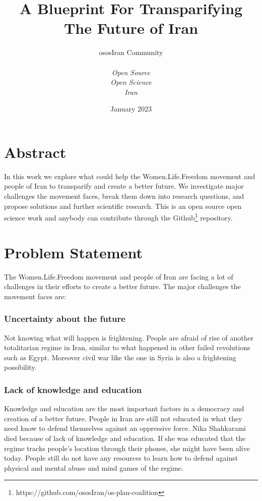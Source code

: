 \documentclass{IEEEtran}
\title{ \Huge \textbf{A Blueprint For Transparifying The Future of Iran} \\[0.5cm]}
\author{
\begin{tabular}{ll}
ososIran Community
\end{tabular} \bigskip \\

\textit{Open Source} \\
\textit{Open Science}\\
\textit{Iran}\\

}
\date{January 2023}
\newcommand{\note}[1]{\todo[inline]{#1}}
\begin{document}
\maketitle




\section{Abstract}

In this work we explore what could help the Women.Life.Freedom movement and people of Iran to transparify and create a better future.
 We investigate major challenges the movement faces, break them down into research questions, and propose solutions and further scientific research.
This is an open source open science work and anybody can contribute through the Github\footnote{https://github.com/ososIran/os-plan-coalition} repository.


\section{Problem Statement}
The Women.Life.Freedom movement and people of Iran are facing a lot of challenges in their efforts to create a better future. 
The major challenges the movement faces are:
\subsubsection{Uncertainty about the future}
Not knowing what will happen is frightening. 
People are afraid of rise of another totalitarian regime in Iran, similar to what happened in other failed revolutions such as Egypt.
Moreover civil war like the one in Syria is also a frightening possibility.

\subsubsection{Lack of knowledge and education}
Knowledge and education are the most important factors in a democracy and creation of a better future.
People in Iran are still not educated in what they need know to defend themselves against an oppressive force.
Nika Shahkarami died because of lack of knowledge and education. If she was educated that 
the regime tracks people's location through their phones, she might have been alive today.
People still do not have any resources to learn how to defend against physical and mental abuse and mind games of the regime. 
\end{document}
